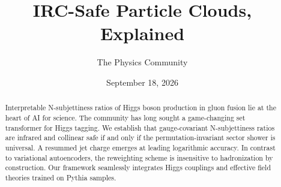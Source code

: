 \documentclass[11pt]{article}
\title{IRC-Safe Particle Clouds, Explained}
\author{The Physics Community}
\date{September 18, 2026}
\begin{document}
\maketitle
\begin{abstract}
Interpretable N-subjettiness ratios of Higgs boson production in gluon
fusion lie at the heart of AI for science. The community has long sought
a game-changing set transformer for Higgs tagging. We establish that
gauge-covariant N-subjettiness ratios are infrared and collinear safe if
and only if the permutation-invariant sector shower is universal. A
resummed jet charge emerges at leading logarithmic accuracy. In contrast
to variational autoencoders, the reweighting scheme is insensitive to
hadronization by construction. Our framework seamlessly integrates Higgs
couplings and effective field theories trained on Pythia samples.
\end{abstract}
\tableofcontents





\nocite{*}


\end{document}

